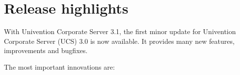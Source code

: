 


\newcommand{\ucsManualTitle}{UCS 3.1 Release Notes}
\newcommand{\ucsManualSubtitle}{Release notes for the installation and update of Univention Corporate Server (UCS) 3.1}
\newcommand{\ucsManualVersion}{3.1}
\newcommand{\ucsTechAuthor}{ & Univention GmbH & feedback@univention.de}

\setcounter{secnumdepth}{3}
\setcounter{tocdepth}{3}



\chapter{Release highlights}

With Univention Corporate Server 3.1, the first minor update for
Univention Corporate Server (UCS) 3.0 is now available. It provides many
new features, improvements and bugfixes.

The most important innovations are:

